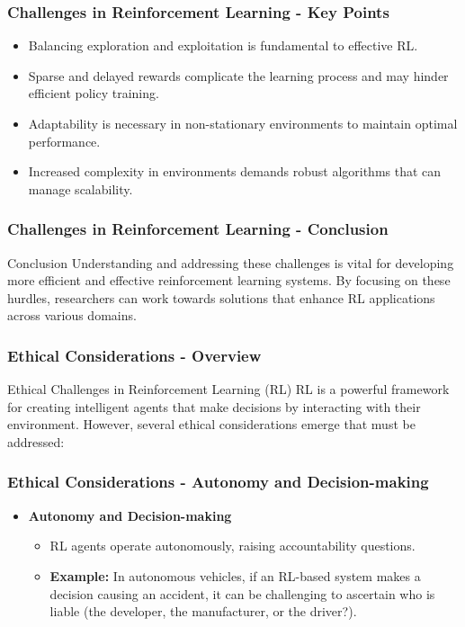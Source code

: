 \documentclass[aspectratio=169]{beamer}
\begin{document}
\begin{frame}[fragile]
    \frametitle{Challenges in Reinforcement Learning - Key Points}
    \begin{itemize}
        \item Balancing exploration and exploitation is fundamental to effective RL.
        \item Sparse and delayed rewards complicate the learning process and may hinder efficient policy training.
        \item Adaptability is necessary in non-stationary environments to maintain optimal performance.
        \item Increased complexity in environments demands robust algorithms that can manage scalability.
    \end{itemize}
\end{frame}

\begin{frame}[fragile]
    \frametitle{Challenges in Reinforcement Learning - Conclusion}
    \begin{block}{Conclusion}
        Understanding and addressing these challenges is vital for developing more efficient and effective reinforcement learning systems. By focusing on these hurdles, researchers can work towards solutions that enhance RL applications across various domains.
    \end{block}
\end{frame}

\begin{frame}[fragile]
    \frametitle{Ethical Considerations - Overview}
    \begin{block}{Ethical Challenges in Reinforcement Learning (RL)}
        RL is a powerful framework for creating intelligent agents that make decisions by interacting with their environment. However, several ethical considerations emerge that must be addressed:
    \end{block}
\end{frame}

\begin{frame}[fragile]
    \frametitle{Ethical Considerations - Autonomy and Decision-making}
    \begin{itemize}
        \item \textbf{Autonomy and Decision-making}
            \begin{itemize}
                \item RL agents operate autonomously, raising accountability questions.
                \item \textbf{Example:} 
                In autonomous vehicles, if an RL-based system makes a decision causing an accident, it can be challenging to ascertain who is liable (the developer, the manufacturer, or the driver?).
            \end{itemize}
    \end{itemize}
\end{frame}
\end{document}
